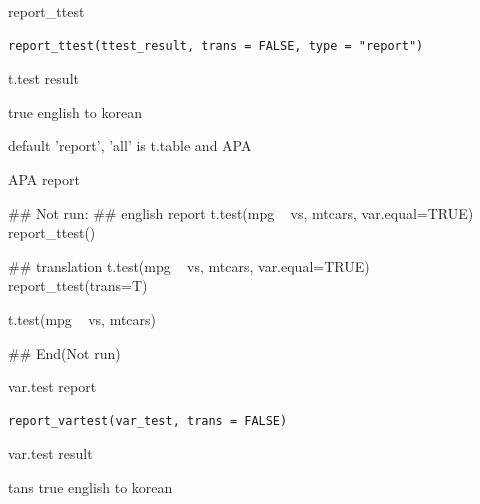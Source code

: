 \documentclass[a4paper]{book}
\begin{document}
%
\begin{Description}
report\_ttest
\end{Description}
%
\begin{Usage}
\begin{verbatim}
report_ttest(ttest_result, trans = FALSE, type = "report")
\end{verbatim}
\end{Usage}
%
\begin{Arguments}
\begin{ldescription}
\item[\code{ttest\_result}] t.test result

\item[\code{trans}] true english to korean

\item[\code{type}] default 'report', 'all' is t.table and APA
\end{ldescription}
\end{Arguments}
%
\begin{Value}
APA report
\end{Value}
%
\begin{Examples}
\begin{ExampleCode}
## Not run: 
## english report
t.test(mpg ~ vs, mtcars, var.equal=TRUE) %
        report_ttest()

## translation
t.test(mpg ~ vs, mtcars, var.equal=TRUE) %
report_ttest(trans=T)

t.test(mpg ~ vs, mtcars) %

## End(Not run)
\end{ExampleCode}
\end{Examples}
%
\begin{Description}
var.test report
\end{Description}
%
\begin{Usage}
\begin{verbatim}
report_vartest(var_test, trans = FALSE)
\end{verbatim}
\end{Usage}
%
\begin{Arguments}
\begin{ldescription}
\item[\code{var\_test}] var.test result

\item[\code{trans}] tans true english to korean
\end{ldescription}
\end{Arguments}
\end{document}
